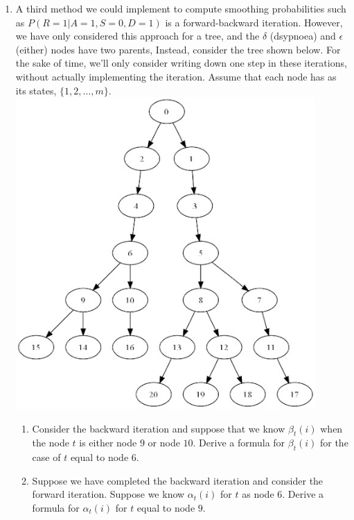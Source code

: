 \documentclass{article}
\begin{document}
\begin{enumerate}
\item A third method we could implement to compute smoothing probabilities such as $P(R=1 | A=1, S=0, D=1)$ is a forward-backward iteration.  However, we have only considered this approach for a tree, and the $\delta$ (dsypnoea) and $\epsilon$ (either) nodes have two parents,  Instead, consider the tree shown below.   For the sake of time, we'll only consider writing down one step in these iterations, without actually implementing the iteration.    Assume that each node has as its states, $\{1,2,\dots,m\}$.
\includegraphics[width=0.9\textwidth]{tree.jpg}
\begin{enumerate}
\item Consider the backward iteration and suppose that we know $\beta_t(i)$ when the node $t$ is either node $9$ or node $10$.  Derive a formula for $\beta_t(i)$ for the case of $t$ equal to node $6$.  
\item Suppose we have completed the backward iteration and consider the forward iteration.  Suppose we know $\alpha_t(i)$ for $t$ as node $6$.  Derive a formula for $\alpha_t(i)$ for $t$ equal to node $9$.

\end{enumerate}
\end{enumerate}
\end{document}
